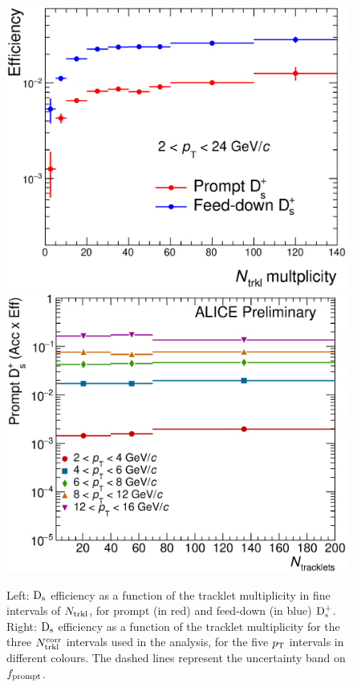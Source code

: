 \begin{figure}[h]
\centering
 \includegraphics[width=.49\textwidth]{FigCap6/EffDsfineNtrklBins_Uncorr.eps}
 \includegraphics[width=.49\textwidth]{FigCap6/PromptDsEfficiency_times_Acceptance_VsNtrkl.eps}
 \caption{Left: ${\rm D_s}$ efficiency as a function of the tracklet multiplicity in fine intervals of $N_{\rm trkl}$, for prompt (in red) and feed-down (in blue) ${\rm D_s^+}$. Right: ${\rm D_s}$ efficiency as a function of the tracklet multiplicity for the three $N_{\rm trkl}^{\rm corr}$ intervals used in the analysis, for the five $p_{\rm T}$ intervals in different colours. The dashed lines represent the uncertainty band on $f_{\rm prompt}$.}
 \label{fig:DsEffVsMult}
\end{figure}



